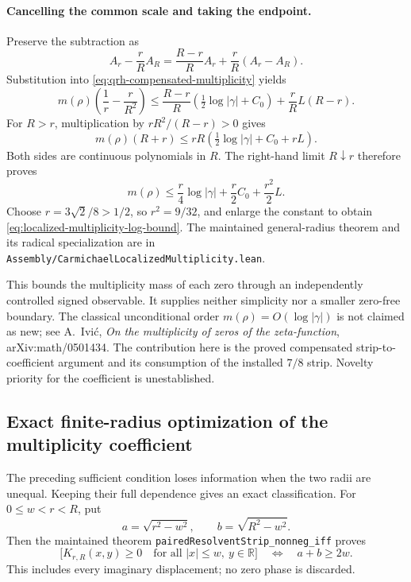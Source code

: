 \paragraph{Cancelling the common scale and taking the endpoint.}
Preserve the subtraction as
\[
 A_r-\frac rR A_R
 =\frac{R-r}{R}A_r+\frac rR(A_r-A_R).
\]
Substitution into \eqref{eq:qrh-compensated-multiplicity} yields
\[
 m(\rho)\left(\frac1r-\frac r{R^2}\right)
 \le\frac{R-r}{R}\left(\tfrac12\log|\gamma|+C_0\right)
     +\frac rR L(R-r).
\]
For \(R>r\), multiplication by \(rR^2/(R-r)>0\) gives
\[
 m(\rho)(R+r)
 \le rR\left(\tfrac12\log|\gamma|+C_0+rL\right).
\]
Both sides are continuous polynomials in \(R\). The right-hand
limit \(R\downarrow r\) therefore proves
\[
 m(\rho)\le\frac r4\log|\gamma|
                 +\frac r2 C_0+\frac{r^2}2L.
\]
Choose \(r=3\sqrt2/8>1/2\), so \(r^2=9/32\), and enlarge the
constant to obtain \eqref{eq:localized-multiplicity-log-bound}.
The maintained general-radius theorem and its radical specialization
are in \texttt{Assembly/CarmichaelLocalizedMultiplicity.lean}.

This bounds the multiplicity mass of each zero through an independently
controlled signed observable. It supplies neither simplicity nor a
smaller zero-free boundary. The classical unconditional order
\(m(\rho)=O(\log|\gamma|)\) is not claimed as new; see A.~Ivi\'c,
\emph{On the multiplicity of zeros of the zeta-function},
arXiv:math/0501434. The contribution here is the proved compensated
strip-to-coefficient argument and its consumption of the installed
\(7/8\) strip. Novelty priority for the coefficient is unestablished.

\subsection{Exact finite-radius optimization of the multiplicity coefficient}
\label{sec:sharp-finite-resolvent}

The preceding sufficient condition loses information when the two radii
are unequal. Keeping their full dependence gives an exact classification.
For \(0\le w<r<R\), put
\[
 a=\sqrt{r^2-w^2},\qquad b=\sqrt{R^2-w^2}.
\]
Then the maintained theorem \texttt{pairedResolventStrip\_nonneg\_iff} proves
\begin{equation}\label{eq:sharp-finite-strip}
 \bigl[K_{r,R}(x,y)\ge0\quad\text{for all }|x|\le w,
                       \ y\in\mathbb R\bigr]
 \quad\Longleftrightarrow\quad a+b\ge2w.
\end{equation}
This includes every imaginary displacement; no zero phase is discarded.

